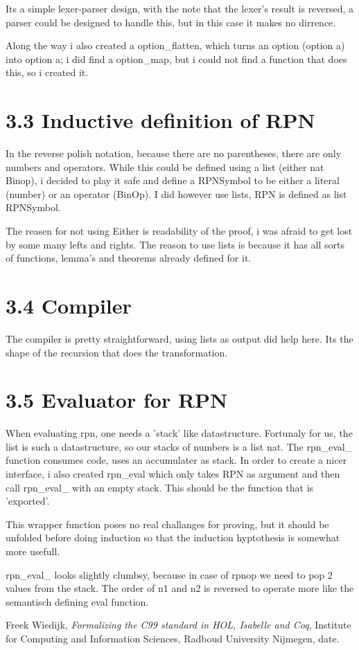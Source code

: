 \documentclass[10pt,a4paper,usenames,dvipnames]{article}
\begin{document}
Its a simple lexer-parser design, with the note that the lexer's result is reversed, a parser could be designed to handle this, but in this case it makes no dirrence.

Along the way i also created a option\_flatten, which turns an option (option a) into option a; i did find a option\_map, but i could not find a function that does this, so i created it.

\section*{3.3 Inductive definition of RPN }

In the reverse polish notation, because there are no parentheses, there are only numbers and operators. While this could be defined using a list (either nat Binop), i decided to play it safe and define a RPNSymbol to be either a literal (number) or an operator (BinOp). I did however use lists, RPN is defined as list RPNSymbol.

The reasen for not using Either is readability of the proof, i was afraid to get lost by some many lefts and rights. The reason to use lists is because it has all sorts of functions, lemma's and theorems already defined for it.

\section*{3.4 Compiler }
The compiler is pretty straightforward, using lists as output did help here. Its the shape of the recursion that does the transformation.

\section*{3.5 Evaluator for RPN}
When evaluating rpn, one needs a 'stack' like datastructure. Fortunaly for us, the list is such a datastructure, so our stacks of numbers is a list nat. The rpn_eval_ function consumes code, uses an accumulater as stack. In order to create a nicer interface, i also created rpn_eval which only takes RPN as argument and then call rpn_eval_ with an empty stack. This should be the function that is 'exported'.

This wrapper function poses no real challanges for proving, but it should be unfolded before doing induction so that the induction hyptothesis is somewhat more usefull.

rpn_eval_ looks slightly clumbsy, because in case of rpnop we need to pop 2 values from the stack. The order of n1 and n2 is reversed to operate more like the semantisch defining eval function.


\begin{thebibliography}{9}

	Freek Wiedijk, 
	\emph{Formalizing the C99 standard in HOL, Isabelle and Coq}, 
	Institute for Computing and Information Sciences, Radboud University Nijmegen, 
	date.

\end{thebibliography}
\end{document}
